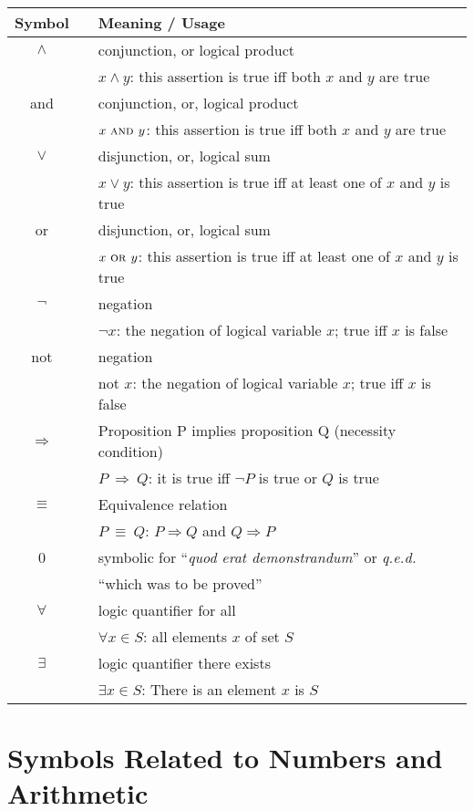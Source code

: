 \begin{tabular}{c|cl}
{\bf Symbol} & & {\bf Meaning} / {\bf Usage} \\ \hline
\hline
$\wedge$
  & & conjunction, or logical product \\
  & & $x \wedge y$: this assertion is true iff both $x$ and $y$ are true \\
{\sc and}
  & & conjunction, or, logical product \\
  & & $x \ \mbox{\sc and } y$: this assertion is true iff both $x$ and $y$ are true \\ \hline
$\vee$
  & & disjunction, or, logical sum \\
  & & $x \vee y$:  this assertion is true iff at least one of $x$ and $y$ is true \\
{\sc or}
  & & disjunction, or, logical sum \\
  & & $x \ \mbox{\sc or } y$:  this assertion is true iff at least one of $x$ and $y$ is true  \\ \hline
$\neg$
  & & negation \\
  & & $\neg x$: the negation of logical variable $x$; true iff $x$ is false \\ 
{\sc not}
  & & negation \\
    & & {\sc not}  $x$: the negation of logical variable $x$; true iff $x$ is false \\ \hline
$ \Rightarrow $
  & & Proposition P implies proposition Q (necessity condition) \\
  & & $P \ \Rightarrow \ Q$: it is true iff $\neg P$ is true or $ Q$ is true  \\ \hline
    $ \equiv $
  & & Equivalence relation \\
  & & $P \ \equiv \ Q$: $P \Rightarrow Q$ and $ Q \Rightarrow P$  \\ \hline
\qed
  & & symbolic for ``{\em quod erat demonstrandum}'' or {\em q.e.d.} \\
  & & ``which was to be proved'' \\
\hline 
$\forall$
  & & logic quantifier for all \\
  & & $\forall x \in S$:  all elements $x$ of set $S$\\ \hline
  $ \exists $
  & & logic quantifier there exists \\
  & & $\exists x \in S$: There is an element $x$ is $S$  \\ \hline
\end{tabular}


\section*{Symbols Related to Numbers and Arithmetic}

